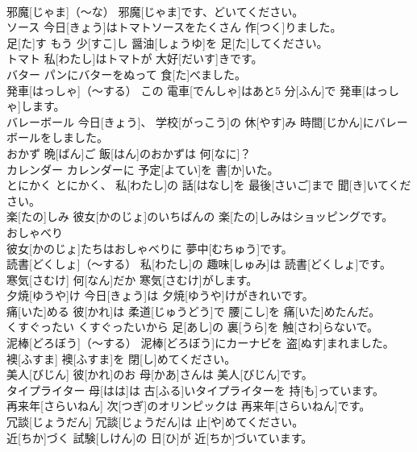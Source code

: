 \documentclass[8pt]{extreport}
\begin{document}
\begin{CJK}{UTF8}{min}
\\	邪魔[じゃま]（～な）	邪魔[じゃま]です、どいてください。		
\\	ソース	今日[きょう]はトマトソースをたくさん 作[つく]りました。		
\\	足[た]す	もう 少[すこ]し 醤油[しょうゆ]を 足[た]してください。		
\\	トマト	私[わたし]はトマトが 大好[だいす]きです。		
\\	バター	パンにバターをぬって 食[た]べました。		
\\	発車[はっしゃ]（～する）	この 電車[でんしゃ]はあと5 分[ふん]で 発車[はっしゃ]します。		
\\	バレーボール	今日[きょう]、 学校[がっこう]の 休[やす]み 時間[じかん]にバレーボールをしました。		
\\	おかず	晩[ばん]ご 飯[はん]のおかずは 何[なに]？		
\\	カレンダー	カレンダーに 予定[よてい]を 書[か]いた。		
\\	とにかく	とにかく、 私[わたし]の 話[はなし]を 最後[さいご]まで 聞[き]いてください。		
\\	楽[たの]しみ	彼女[かのじょ]のいちばんの 楽[たの]しみはショッピングです。		
\\	おしゃべり 
\\	彼女[かのじょ]たちはおしゃべりに 夢中[むちゅう]です。		
\\	読書[どくしょ]（～する）	私[わたし]の 趣味[しゅみ]は 読書[どくしょ]です。		
\\	寒気[さむけ]	何[なん]だか 寒気[さむけ]がします。		
\\	夕焼[ゆうや]け	今日[きょう]は 夕焼[ゆうや]けがきれいです。		
\\	痛[いた]める	彼[かれ]は 柔道[じゅうどう]で 腰[こし]を 痛[いた]めたんだ。		
\\	くすぐったい	くすぐったいから 足[あし]の 裏[うら]を 触[さわ]らないで。		
\\	泥棒[どろぼう]（～する）	泥棒[どろぼう]にカーナビを 盗[ぬす]まれました。		
\\	襖[ふすま]	襖[ふすま]を 閉[し]めてください。		
\\	美人[びじん]	彼[かれ]のお 母[かあ]さんは 美人[びじん]です。		
\\	タイプライター	母[はは]は 古[ふる]いタイプライターを 持[も]っています。		
\\	再来年[さらいねん]	次[つぎ]のオリンピックは 再来年[さらいねん]です。		
\\	冗談[じょうだん]	冗談[じょうだん]は 止[や]めてください。		
\\	近[ちか]づく	試験[しけん]の 日[ひ]が 近[ちか]づいています。		

\end{CJK}
\end{document}
